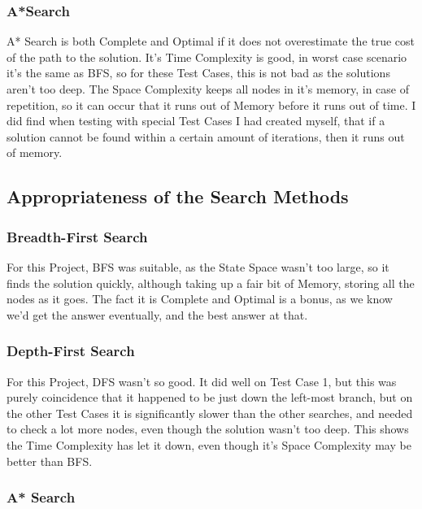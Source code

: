 \documentclass[11pt]{article} %
\begin{document}
				\subsubsection{A*Search}

					A* Search is both Complete and Optimal if it does not overestimate the true cost of the path to the solution. It's Time Complexity is good, in worst case scenario it's the same as BFS, so for these Test Cases, this is not bad as the solutions aren't too deep. The Space Complexity keeps all nodes in it's memory, in case of repetition, so it can occur that it runs out of Memory before it runs out of time. I did find when testing with special Test Cases I had created myself, that if a solution cannot be found within a certain amount of iterations, then it runs out of memory.
	
	\newpage
			\subsection{Appropriateness of the Search Methods}
	
				\subsubsection{Breadth-First Search}

					For this Project, BFS was suitable, as the State Space wasn't too large, so it finds the solution quickly, although taking up a fair bit of Memory, storing all the nodes as it goes. The fact it is Complete and Optimal is a bonus, as we know we'd get the answer eventually, and the best answer at that.
	
				\subsubsection{Depth-First Search}

					For this Project, DFS wasn't so good. It did well on Test Case 1, but this was purely coincidence that it happened to be just down the left-most branch, but on the other Test Cases it is significantly slower than the other searches, and needed to check a lot  more nodes, even though the solution wasn't too deep. This shows the Time Complexity has let it down, even though it's Space Complexity may be better than BFS.

				\subsubsection{A* Search}
		
\end{document}
